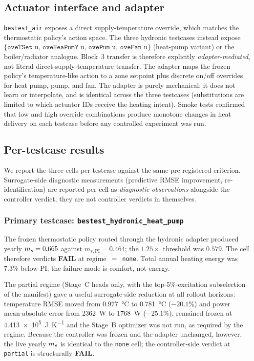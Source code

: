 \subsection{Actuator interface and adapter}
\label{ssec:res3_adapter}

\texttt{bestest\_air} exposes a direct supply-temperature override, which
matches the thermostatic policy's action space. The three hydronic
testcases instead expose
\(\{\texttt{oveTSet\_u},\, \texttt{oveHeaPumY\_u},\, \texttt{ovePum\_u},\,
\texttt{oveFan\_u}\}\) (heat-pump variant) or the boiler/radiator analogue.
Block~3 transfer is therefore explicitly \emph{adapter-mediated}, not
literal direct-supply-temperature transfer. The adapter maps the frozen
policy's temperature-like action to a zone setpoint plus discrete on/off
overrides for heat pump, pump, and fan. The adapter is purely mechanical:
it does not learn or interpolate, and is identical across the three
testcases (substitutions are limited to which actuator IDs receive the
heating intent). Smoke tests confirmed that low and high override
combinations produce monotone changes in heat delivery on each testcase
before any controlled experiment was run.

\subsection{Per-testcase results}
\label{ssec:res3_per_testcase}

We report the three cells per testcase against the same pre-registered
criterion. Surrogate-side diagnostic measurements (predictive RMSE
improvement, \czon{} re-identification) are reported per cell as
\emph{diagnostic observations} alongside the controller verdict; they are
not controller verdicts in themselves.

\subsubsection{Primary testcase: \texttt{bestest\_hydronic\_heat\_pump}}

The frozen thermostatic policy routed through the hydronic adapter
produced yearly \(m_s = 0.665\) against
\(m_{s,\mathrm{PI}} = 0.464\); the \(1.25\times\) threshold was
\(0.579\). The cell therefore verdicts \textbf{FAIL} at
regime~$=$~\texttt{none}. Total annual heating energy was $7.3\%$ below PI;
the failure mode is comfort, not energy.

The partial regime (Stage~C heads only, with the
top-$5\%$-excitation subselection of the manifest) gave a useful
surrogate-side reduction at all rollout horizons: temperature RMSE moved
from \SI{0.977}{\celsius} to \SI{0.781}{\celsius} ($-20.1\%$) and power
mean-absolute error from \SI{2362}{\watt} to \SI{1768}{\watt} ($-25.1\%$).
\czon{} remained frozen at \SI{4.413e5}{\joule\per\kelvin} and the
Stage~B optimizer was not run, as required by the regime. Because the
controller was frozen and the adapter unchanged, however, the live yearly
\(m_s\) is identical to the \texttt{none} cell; the controller-side
verdict at \texttt{partial} is structurally \textbf{FAIL}.

